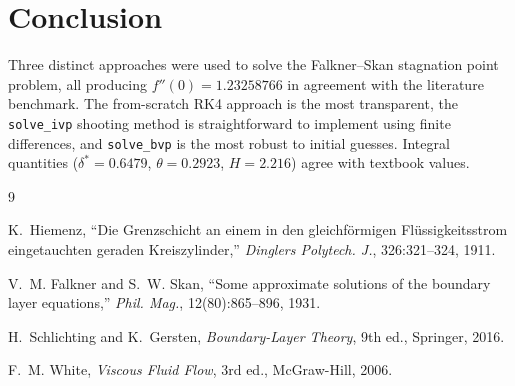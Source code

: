 \documentclass[12pt,a4paper]{article}
\begin{document}
\section{Conclusion}

Three distinct approaches were used to solve the Falkner--Skan stagnation point problem, all producing $f''(0) = 1.23258766$ in agreement with the literature benchmark. The from-scratch RK4 approach is the most transparent, the \texttt{solve\_ivp} shooting method is straightforward to implement using finite differences, and \texttt{solve\_bvp} is the most robust to initial guesses. Integral quantities ($\delta^* = 0.6479$, $\theta = 0.2923$, $H = 2.216$) agree with textbook values.

\begin{thebibliography}{9}

K.~Hiemenz, ``Die Grenzschicht an einem in den gleichförmigen Flüssigkeitsstrom eingetauchten geraden Kreiszylinder,'' \textit{Dinglers Polytech. J.}, 326:321--324, 1911.

V.~M. Falkner and S.~W. Skan, ``Some approximate solutions of the boundary layer equations,'' \textit{Phil. Mag.}, 12(80):865--896, 1931.

H.~Schlichting and K.~Gersten, \textit{Boundary-Layer Theory}, 9th ed., Springer, 2016.

F.~M. White, \textit{Viscous Fluid Flow}, 3rd ed., McGraw-Hill, 2006.

\end{thebibliography}
\end{document}

